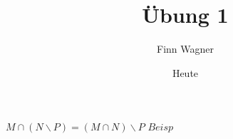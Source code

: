 \documentclass{article}
\title{Übung 1}
\author{Finn Wagner}
\date{Heute}
\begin{document}
\LARGE\(M \cap (N \backslash P) = (M \cap N) \backslash P\)
\(Beisp\)
\end{document}
